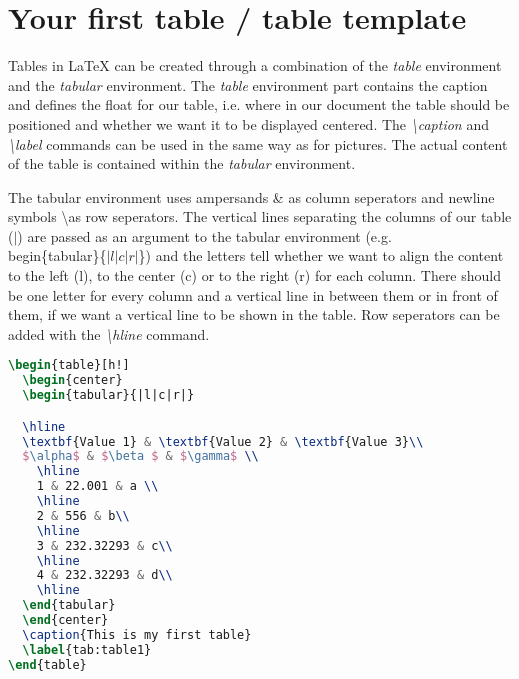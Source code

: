 \documentclass[%
  parskip=full,%
  twoside=false%
]{book}
\newcommand{\itf}{\textit}
\newcommand{\bksl}{\textbackslash}
\begin{document}
\section{Your first table / table template}

Tables in LaTeX can be created through a combination of the \itf{table} environment and the \itf{tabular} environment. The \itf{table} environment part contains the caption and defines the float for our table, i.e. where in our document the table should be positioned and whether we want it to be displayed centered. The \itf{\bksl caption} and \itf{\bksl label} commands can be used in the same way as for pictures. The actual content of the table is contained within the \textit{tabular} environment.

The tabular environment uses ampersands \& as column seperators and newline symbols \bksl as row seperators. The vertical lines separating the columns of our table ($|$) are passed as an argument to the tabular environment (e.g. \\begin\{tabular\}\{$|l|c|r|$\}) and the letters tell whether we want to align the content to the left (l), to the center (c) or to the right (r) for each column. There should be one letter for every column and a vertical line in between them or in front of them, if we want a vertical line to be shown in the table. Row seperators can be added with the \itf{\bksl hline} command.

\begin{lstlisting}[language=TeX]
\begin{table}[h!]
  \begin{center}
  \begin{tabular}{|l|c|r|}

  \hline
  \textbf{Value 1} & \textbf{Value 2} & \textbf{Value 3}\\
  $\alpha$ & $\beta $ & $\gamma$ \\
    \hline
    1 & 22.001 & a \\
    \hline
    2 & 556 & b\\
    \hline
    3 & 232.32293 & c\\
    \hline
    4 & 232.32293 & d\\
    \hline
  \end{tabular}
  \end{center}
  \caption{This is my first table}
  \label{tab:table1}
\end{table}
\end{lstlisting}
\end{document}
